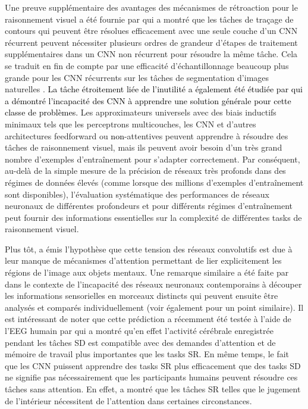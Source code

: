 \color{black}
Une preuve suppl\'ementaire des avantages des m\'ecanismes de r\'etroaction pour le raisonnement visuel a \'et\'e fournie par \citet{linsley2018learning} qui a montr\'e que les tâches de traçage de contours qui peuvent \^etre r\'esolues efficacement avec une seule couche d'un CNN r\'ecurrent peuvent n\'ecessiter plusieurs ordres de grandeur d'\'etapes de traitement suppl\'ementaires dans un CNN non r\'ecurrent pour r\'esoudre la m\^eme tâche. Cela se traduit en fin de compte par une efficacit\'e d'\'echantillonnage beaucoup plus grande pour les CNN r\'ecurrents sur les tâches de segmentation d'images naturelles \citep{linsley2020recurrent}. \textcolor{black}{La tâche \'etroitement li\'ee de l'inutilit\'e a \'egalement \'et\'e \'etudi\'ee par \citet{villalobos2021neural} qui a d\'emontr\'e l'incapacit\'e des CNN \`a apprendre une solution g\'en\'erale pour cette classe de probl\`emes.}
Les approximateurs universels avec des biais inductifs minimaux tels que les perceptrons multicouches, les CNN et d'autres architectures feedforward ou \textcolor{black}{non}-attentives peuvent apprendre \`a r\'esoudre des tâches de raisonnement visuel, mais ils peuvent avoir besoin d'un tr\`es grand nombre d'exemples d'entraînement pour s'adapter correctement. Par cons\'equent, au-del\`a de la simple mesure de la pr\'ecision de r\'eseaux tr\`es profonds dans des r\'egimes de donn\'ees \'elev\'es (comme lorsque des millions d'exemples d'entraînement sont disponibles), l'\'evaluation syst\'ematique des performances de r\'eseaux neuronaux de diff\'erentes profondeurs et pour diff\'erents r\'egimes d'entraînement peut fournir des informations essentielles sur la complexit\'e de diff\'erentes tasks de raisonnement visuel.

Plus tôt, \citet{kim2018not} a \'emis l'hypoth\`ese que cette tension des r\'eseaux convolutifs est due \`a leur manque de m\'ecanismes d'attention permettant de lier explicitement les r\'egions de l'image aux objets mentaux. Une remarque similaire a \'et\'e faite par \citet{greff2020binding} dans le contexte de l'incapacit\'e des r\'eseaux neuronaux contemporains \`a d\'ecouper les informations sensorielles en morceaux distincts qui peuvent ensuite \^etre analys\'es et compar\'es individuellement (voir \'egalement \citet{10.1007/978-3-540-75555-5_15} pour un point similaire). Il est int\'eressant de noter que cette pr\'ediction a r\'ecemment \'et\'e test\'ee \`a l'aide de l'EEG humain par \citet{AlamiaENEURO.0267-20.2020} qui a montr\'e qu'en effet l'activit\'e c\'er\'ebrale enregistr\'ee pendant les tâches SD est compatible avec des demandes d'attention et de m\'emoire de travail plus importantes que les tasks SR. En m\^eme temps, le fait que les CNN puissent apprendre des tasks SR plus efficacement que des tasks SD ne signifie pas n\'ecessairement que les participants humains peuvent r\'esoudre ces tâches sans attention. En effet, \citep{logan1994spatial} a montr\'e que les tâches SR telles que le jugement de l'int\'erieur n\'ecessitent de l'attention dans certaines circonstances.

